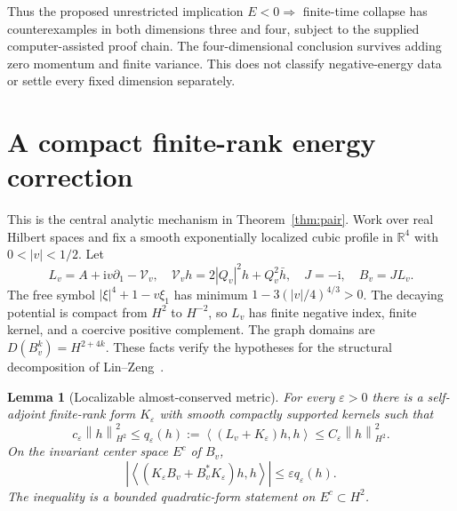 \documentclass[11pt,a4paper]{article}
\newtheorem{lemma}[theorem]{Lemma}
\theoremstyle{remark}\newtheorem{remark}[theorem]{Remark}
\newcommand{\R}{\mathbb R}\newcommand{\C}{\mathbb C}
\newcommand{\ii}{\mathrm i}\newcommand{\dd}{\,\mathrm d}
\newcommand{\norm}[1]{\left\|#1\right\|}
\newcommand{\ip}[2]{\left\langle #1,#2\right\rangle}
\begin{document}
Thus the proposed unrestricted implication $E<0\Rightarrow$ finite-time collapse has counterexamples in both dimensions three and four, subject to the supplied computer-assisted proof chain. The four-dimensional conclusion survives adding zero momentum and finite variance. This does not classify negative-energy data or settle every fixed dimension separately.

\section{A compact finite-rank energy correction}
This is the central analytic mechanism in Theorem~\ref{thm:pair}. Work over real Hilbert spaces and fix a smooth exponentially localized cubic profile in $\R^4$ with $0<|v|<1/2$. Let
\[
 L_v=A+\ii v\partial_1-\mathcal V_v,\quad
 \mathcal V_vh=2|Q_v|^2h+Q_v^2\bar h,\quad
 J=-\ii,\quad B_v=JL_v.
\]
The free symbol $|\xi|^4+1-v\xi_1$ has minimum
$1-3(|v|/4)^{4/3}>0$. The decaying potential is compact from $H^2$ to $H^{-2}$, so $L_v$ has finite negative index, finite kernel, and a coercive positive complement. The graph domains are $D(B_v^k)=H^{2+4k}$. These facts verify the hypotheses for the structural decomposition of Lin--Zeng~\cite{LZ}.

\begin{lemma}[Localizable almost-conserved metric]\label{lem:metric}
For every $\varepsilon>0$ there is a self-adjoint finite-rank form $K_\varepsilon$ with smooth compactly supported kernels such that
\[
 c_\varepsilon\norm h_{H^2}^2\le
 q_\varepsilon(h):=\ip{(L_v+K_\varepsilon)h}{h}
 \le C_\varepsilon\norm h_{H^2}^2.
\]
On the invariant center space $E^c$ of $B_v$,
\begin{equation}\label{eq:metricder}
 \left|\ip{(K_\varepsilon B_v+B_v^*K_\varepsilon)h}{h}\right|
 \le\varepsilon q_\varepsilon(h).
\end{equation}
The inequality is a bounded quadratic-form statement on $E^c\subset H^2$.
\end{lemma}
\end{document}
